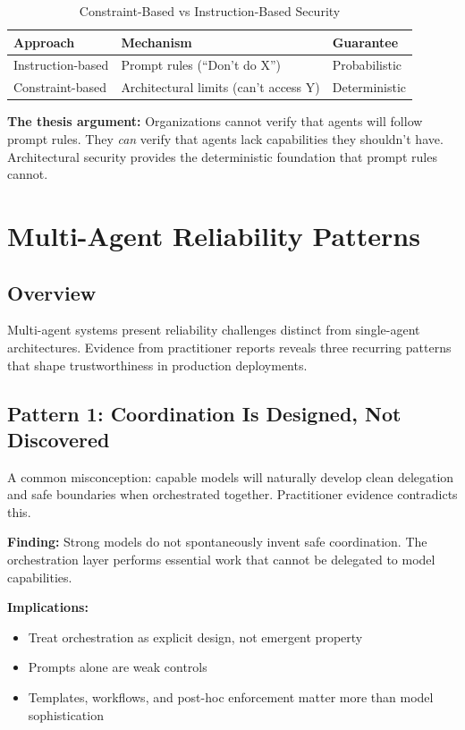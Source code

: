 \begin{table}[htbp]
\centering
\caption{Constraint-Based vs Instruction-Based Security}
\label{tab:constraint-vs-instruction}
\begin{tabular}{lll}
\toprule
\textbf{Approach} & \textbf{Mechanism} & \textbf{Guarantee} \\
\midrule
Instruction-based & Prompt rules (``Don't do X'') & Probabilistic \\
Constraint-based & Architectural limits (can't access Y) & Deterministic \\
\bottomrule
\end{tabular}
\end{table}

\textbf{The thesis argument:} Organizations cannot verify that agents will follow prompt rules. They \textit{can} verify that agents lack capabilities they shouldn't have. Architectural security provides the deterministic foundation that prompt rules cannot.

\section{Multi-Agent Reliability Patterns}
\label{sec:multi-agent-reliability}

\subsection{Overview}
\label{subsec:multi-agent-overview}

Multi-agent systems present reliability challenges distinct from single-agent architectures. Evidence from practitioner reports reveals three recurring patterns that shape trustworthiness in production deployments.

\subsection{Pattern 1: Coordination Is Designed, Not Discovered}
\label{subsec:coordination-designed}

A common misconception: capable models will naturally develop clean delegation and safe boundaries when orchestrated together. Practitioner evidence contradicts this.

\textbf{Finding:} Strong models do not spontaneously invent safe coordination. The orchestration layer performs essential work that cannot be delegated to model capabilities.

\textbf{Implications:}
\begin{itemize}
    \item Treat orchestration as explicit design, not emergent property
    \item Prompts alone are weak controls
    \item Templates, workflows, and post-hoc enforcement matter more than model sophistication
\end{itemize}

